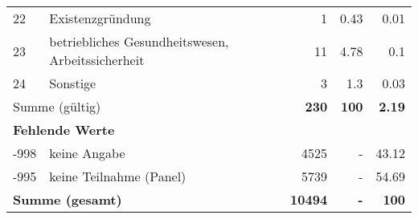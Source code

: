 \begin{longtable}{lXrrr}
        22 & \multicolumn{1}{X}{Existenzgründung} & %
          \num{1} &
          \num[round-mode=places,round-precision=2]{0.43} &
          \num[round-mode=places,round-precision=2]{0.01} \\

        23 & \multicolumn{1}{X}{betriebliches Gesundheitswesen, Arbeitssicherheit} & %
          \num{11} &
          \num[round-mode=places,round-precision=2]{4.78} &
          \num[round-mode=places,round-precision=2]{0.1} \\

        24 & \multicolumn{1}{X}{Sonstige} & %
          \num{3} &
          \num[round-mode=places,round-precision=2]{1.3} &
          \num[round-mode=places,round-precision=2]{0.03} \\

     \midrule
     \multicolumn{2}{l}{Summe (gültig)} &
       \textbf{\num{230}} &
     \textbf{\num{100}} &
       \textbf{\num[round-mode=places,round-precision=2]{2.19}} \\
     \multicolumn{5}{l}{\textbf{Fehlende Werte}}\\
       -998 &
       keine Angabe &
         \num{4525} &
        - &
         \num[round-mode=places,round-precision=2]{43.12} \\
       -995 &
       keine Teilnahme (Panel) &
         \num{5739} &
        - &
         \num[round-mode=places,round-precision=2]{54.69} \\
     \midrule
     \multicolumn{2}{l}{\textbf{Summe (gesamt)}} &
          \textbf{\num{10494}} &
        \textbf{-} &
        \textbf{\num{100}} \\
     \bottomrule
     \end{longtable}
     
